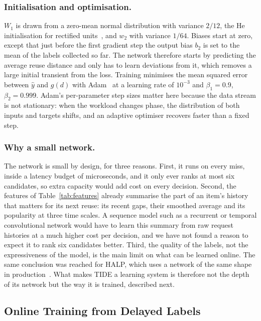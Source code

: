 \documentclass{llncs}
\begin{document}
\subsubsection{Initialisation and optimisation.}
$W_1$ is drawn from a zero-mean normal distribution with variance $2/12$, the He initialisation for rectified units~\cite{he2015}, and $w_2$ with variance $1/64$. Biases start at zero, except that just before the first gradient step the output bias $b_2$ is set to the mean of the labels collected so far. The network therefore starts by predicting the average reuse distance and only has to learn deviations from it, which removes a large initial transient from the loss. Training minimises the mean squared error between $\hat{y}$ and $g(d)$ with Adam~\cite{kingma2015} at a learning rate of $10^{-3}$ and $\beta_1 = 0.9$, $\beta_2 = 0.999$. Adam's per-parameter step sizes matter here because the data stream is not stationary: when the workload changes phase, the distribution of both inputs and targets shifts, and an adaptive optimiser recovers faster than a fixed step.

\subsubsection{Why a small network.}
The network is small by design, for three reasons. First, it runs on every miss, inside a latency budget of microseconds, and it only ever ranks at most six candidates, so extra capacity would add cost on every decision. Second, the features of Table~\ref{tab:features} already summarise the part of an item's history that matters for its next reuse: its recent gaps, their smoothed average and its popularity at three time scales. A sequence model such as a recurrent or temporal convolutional network would have to learn this summary from raw request histories at a much higher cost per decision, and we have not found a reason to expect it to rank six candidates better. Third, the quality of the labels, not the expressiveness of the model, is the main limit on what can be learned online. The same conclusion was reached for HALP, which uses a network of the same shape in production~\cite{song2023}. What makes TIDE a learning system is therefore not the depth of its network but the way it is trained, described next.

\subsection{Online Training from Delayed Labels}
\label{sec:online-training}
\end{document}
